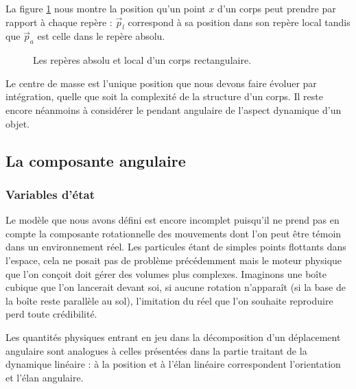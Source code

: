 La figure \ref{reperelocal} nous montre la position qu'un point $x$
d'un corps peut prendre par rapport à chaque repère : $\vec{p}_l$
correspond à sa position dans son repère local tandis que $\vec{p}_a$
est celle dans le repère absolu.

\begin{figure}
  \centering
  
  \caption{Les repères absolu et local d'un corps rectangulaire.}
  \label{reperelocal}
\end{figure}

Le centre de masse est l'unique position que nous devons faire évoluer
par intégration, quelle que soit la complexité de la structure d'un
corps. Il reste encore néanmoins à considérer le pendant angulaire de
l'aspect dynamique d'un objet.

\subsection{La composante angulaire}

\subsubsection{Variables d'état}

Le modèle que nous avons défini est encore incomplet puisqu'il ne
prend pas en compte la composante rotationnelle des mouvements dont
l'on peut être témoin dans un environnement réel. Les particules étant
de simples points flottants dans l'espace, cela ne posait pas de
problème précédemment mais le moteur physique que l'on conçoit doit
gérer des volumes plus complexes. Imaginons une boîte cubique que l'on
lancerait devant soi, si aucune rotation n'apparaît (si la base de la
boîte reste parallèle au sol), l'imitation du réel que l'on souhaite
reproduire perd toute crédibilité.

Les quantités physiques entrant en jeu dans la décomposition d'un
déplacement angulaire sont analogues à celles présentées dans la
partie traitant de la dynamique linéaire : à la position et à l'élan
linéaire correspondent l'orientation et l'élan angulaire.

